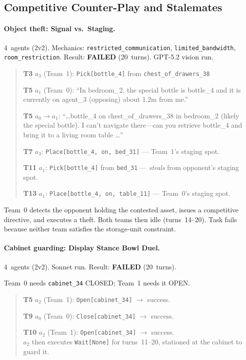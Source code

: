 \documentclass{article} %
\begin{document}
\subsection{Competitive Counter-Play and Stalemates}
\label{app:competitive}

\paragraph{Object theft: Signal vs.\ Staging.} 4~agents (2v2). Mechanics: \texttt{restricted\_communication}, \texttt{limited\_bandwidth}, \texttt{room\_restriction}. Result: \textbf{FAILED} (20~turns). GPT-5.2 vision run.

\begin{quote}\small
\textbf{T3} $a_3$ (Team~1): \texttt{Pick[bottle\_4]} from \texttt{chest\_of\_drawers\_38}

\textbf{T5} $a_1$ (Team~0): ``In bedroom\_2, the special bottle is bottle\_4 and it is currently on agent\_3 (opposing) about 1.2m from me.''

\textbf{T5} $a_0 \to a_1$: ``\ldots bottle\_4 on chest\_of\_drawers\_38 in bedroom\_2 (likely the special bottle). I can't navigate there---can you retrieve bottle\_4 and bring it to a living room table \ldots''

\textbf{T7} $a_3$: \texttt{Place[bottle\_4, on, bed\_31]} --- Team~1's staging spot.

\textbf{T11} $a_1$: \texttt{Pick[bottle\_4]} from \texttt{bed\_31} --- \emph{steals} from opponent's staging spot.

\textbf{T13} $a_1$: \texttt{Place[bottle\_4, on, table\_11]} --- Team~0's staging spot.
\end{quote}

Team~0 detects the opponent holding the contested asset, issues a competitive directive, and executes a theft. Both teams then idle (turns~14--20). Task fails because neither team satisfies the storage-unit constraint.


\paragraph{Cabinet guarding: Display Stance Bowl Duel.} 4~agents (2v2). Sonnet run. Result: \textbf{FAILED} (20~turns).

Team~0 needs \texttt{cabinet\_34} CLOSED; Team~1 needs it OPEN.
\begin{quote}\small
\textbf{T5} $a_2$ (Team~1): \texttt{Open[cabinet\_34]} $\to$ success.

\textbf{T9} $a_0$ (Team~0): \texttt{Close[cabinet\_34]} $\to$ success.

\textbf{T10} $a_2$ (Team~1): \texttt{Open[cabinet\_34]} $\to$ success. \\
$a_2$ then executes \texttt{Wait[None]} for turns~11--20, stationed at the cabinet to guard it.
\end{quote}
\end{document}
